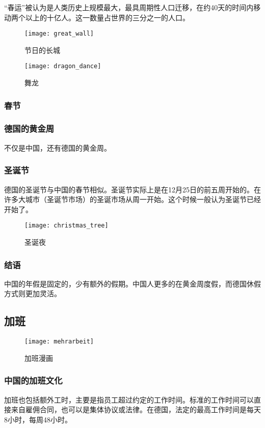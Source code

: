 “春运”被认为是人类历史上规模最大，最具周期性人口迁移，在约40天的时间内移动两个以上的十亿人。这一数量占世界的三分之一的人口。
\begin{figure}[htb]
    \centering
    \texttt{[image: great\_wall]}
    \caption{节日的长城}
\end{figure}
\begin{figure}[htb]
    \centering
    \texttt{[image: dragon\_dance]}
    \caption{舞龙}
\end{figure}

\subsubsection{春节}

\subsubsection{德国的黄金周}
不仅是中国，还有德国的黄金周。

\subsubsection{圣诞节}

德国的圣诞节与中国的春节相似。圣诞节实际上是在12月25日的前五周开始的。在许多大城市（圣诞节市场）的圣诞市场从周一开始。这个时候一般认为圣诞节已经开始了。
\begin{figure}[htb]
    \centering
    \texttt{[image: christmas\_tree]}
    \caption{圣诞夜}
\end{figure}

\subsubsection{结语}
中国的年假是固定的，少有额外的假期。中国人更多的在黄金周度假，而德国休假方式则更加灵活。
\subsection{加班}
\begin{figure}[htb]
    \centering
    \texttt{[image: mehrarbeit]}
    \caption{加班漫画}
\end{figure}

\subsubsection{中国的加班文化}
加班也包括额外工时，主要是指员工超过约定的工作时间。标准的工作时间可以直接来自雇佣合同，也可以是集体协议或法律。在德国，法定的最高工作时间是每天8小时，每周48小时。

